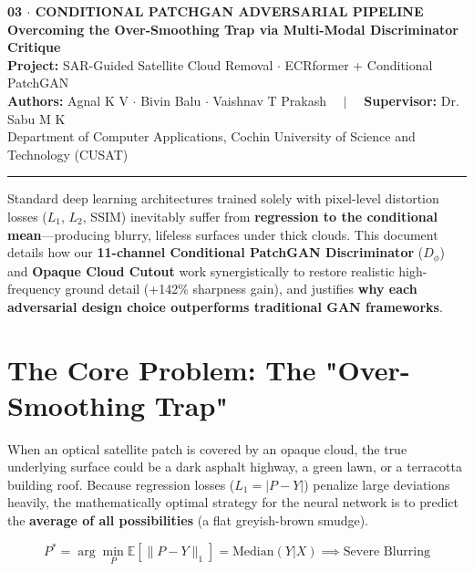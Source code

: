 \documentclass[11pt,a4paper]{article}
\begin{document}
\begin{center}
    {\LARGE \textbf{\textcolor{primary}{03 $\cdot$ CONDITIONAL PATCHGAN ADVERSARIAL PIPELINE}}}\\[0.4em]
    {\large \textbf{Overcoming the Over-Smoothing Trap via Multi-Modal Discriminator Critique}}\\[0.6em]
    {\small \textbf{Project:} SAR-Guided Satellite Cloud Removal $\cdot$ ECRformer + Conditional PatchGAN}\\
    {\small \textbf{Authors:} Agnal K V $\cdot$ Bivin Balu $\cdot$ Vaishnav T Prakash $\quad|\quad$ \textbf{Supervisor:} Dr. Sabu M K}\\
    {\small Department of Computer Applications, Cochin University of Science and Technology (CUSAT)}
\end{center}
\vspace{-0.5em}
\noindent\rule{\linewidth}{1.2pt}

\vspace{0.8em}
\begin{tcolorbox}[colback=primary!5!white,colframe=primary,title=\textbf{Document Purpose \& Adversarial Objective},fonttitle=\bfseries]
Standard deep learning architectures trained solely with pixel-level distortion losses ($L_1$, $L_2$, SSIM) inevitably suffer from \textbf{regression to the conditional mean}---producing blurry, lifeless surfaces under thick clouds. This document details how our \textbf{11-channel Conditional PatchGAN Discriminator} ($D_\phi$) and \textbf{Opaque Cloud Cutout} work synergistically to restore realistic high-frequency ground detail (+142\% sharpness gain), and justifies \textbf{why each adversarial design choice outperforms traditional GAN frameworks}.
\end{tcolorbox}

\section{The Core Problem: The "Over-Smoothing Trap"}

When an optical satellite patch is covered by an opaque cloud, the true underlying surface could be a dark asphalt highway, a green lawn, or a terracotta building roof. Because regression losses ($L_1 = |P - Y|$) penalize large deviations heavily, the mathematically optimal strategy for the neural network is to predict the \textbf{average of all possibilities} (a flat greyish-brown smudge). 

\begin{equation}
P^* = \arg\min_P \mathbb{E}[\|P - Y\|_1] = \text{Median}(Y | X) \implies \text{Severe Blurring}
\end{equation}
\end{document}
